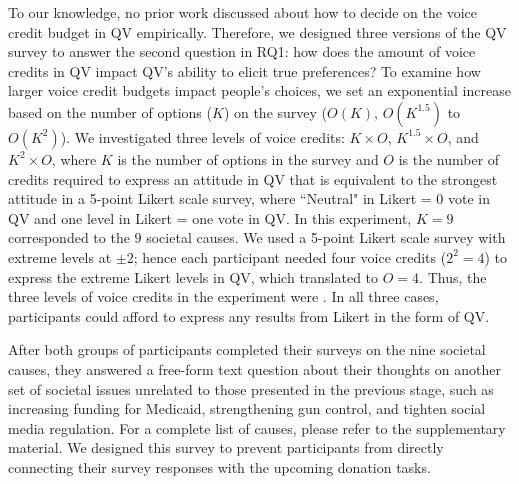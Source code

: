 To our knowledge, no prior work discussed about how to decide on the voice credit budget in QV empirically. Therefore, we designed three versions of the QV survey to answer the second question in RQ1: how does the amount of voice credits in QV impact QV's ability to elicit true preferences? To examine how larger voice credit budgets impact people's choices, we set an exponential increase based on the number of options ($K$) on the survey ($O(K)$, $O(K^{1.5})$ to $O(K^2)$). We investigated three levels of voice credits: $K \times O$, $K^{1.5} \times O$, and $K^2 \times O$, where $K$ is the number of options in the survey and $O$ is the number of credits required to express an attitude in QV that is equivalent to the strongest attitude in a 5-point Likert scale survey, where ``Neutral" in Likert = 0 vote in QV and one level in Likert = one vote in QV. In this experiment, $K=9$ corresponded to the $9$ societal causes. We used a 5-point Likert scale survey with extreme levels at $\pm 2$; hence each participant needed four voice credits ($2^2=4$) to express the extreme Likert levels in QV, which translated to $O=4$. Thus, the three levels of voice credits in the experiment were {}. In all three cases, participants could afford to express any results from Likert in the form of QV. 
{}

{} After both groups of participants completed their surveys on the nine societal causes, {} they answered a free-form text question about their thoughts on another set of societal issues unrelated to those presented in the previous stage, such as increasing funding for Medicaid, strengthening gun control, and tighten social media regulation. For a complete list of causes, please refer to the supplementary material. {} We designed this survey to prevent participants from directly connecting their survey responses with the upcoming donation tasks.


